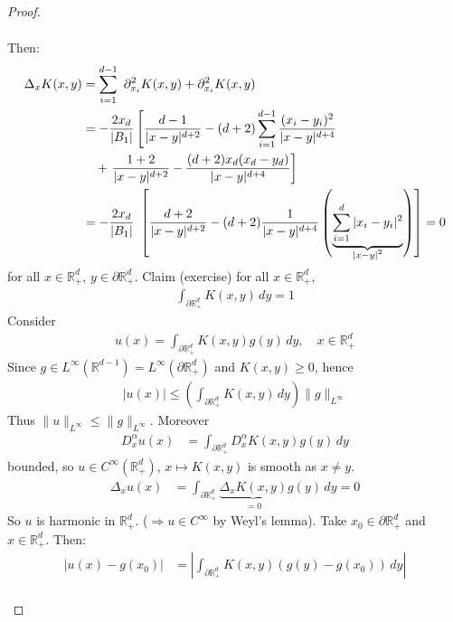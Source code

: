 \documentclass{report}
\theoremstyle{tommy}
\begin{document}
\begin{proof}
\begin{itemize}
\begin{align*}
      \end{align*}
      Then: \begin{align*}
        \Delta_x K(x,y) 
        &= \sum_{i=1}^{d-1} \partial_{x_i}^2 K(x,y) + \partial_{x_i}^2 K(x,y) \\
        &= - \frac{2 x_d}{|B_1|} \left[\frac{d-1}{|x-y|^{d+2}} - (d+2) \sum_{i=1}^{d-1} \frac{(x_i - y_i)^2}{|x-y|^{d+4}} \right. \\
        &\quad + \left. \frac{1+2}{|x-y|^{d+2}} - \frac{(d+2)x_d(x_d-y_d)}{|x-y|^{d+4}}\right] \\
        &= - \frac{2 x_d}{|B_1|} \left[\frac{d+2}{|x-y|^{d+2}} - (d+2) \frac{1}{|x-y|^{d+4}} \left(\underbrace{\sum_{i=1}^d |x_i - y_i|^2}_{\smash{|x-y|^2}}\right)\right] = 0
      \end{align*}
      for all \(x \in \mathbb{R}_+^d\), \(y \in \partial \mathbb{R}_+^d\).
      Claim (exercise) for all \(x \in \mathbb{R}_+^d\), 
      \begin{align*}
        \int_{\partial \mathbb{R}_+^d} K(x,y) \, dy = 1 
      \end{align*}
      Consider 
      \begin{align*}
        u(x) = \int_{\partial \mathbb{R}_+^d} K(x,y) g(y) \, dy, \quad x \in \mathbb{R}_+^d
      \end{align*}
      Since \(g \in L^\infty(\mathbb{R}^{d-1}) = L^\infty(\partial \mathbb{R}_+^d)\) and \(K(x,y) \ge 0\), hence 
      \begin{align*}
        |u(x)| \le \left(\int_{\partial \mathbb{R}_+^d} K(x,y) \, dy\right) \|g\|_{L^\infty}
      \end{align*}
      Thus \(\|u\|_{L^\infty} \le \|g\|_{L^\infty}\). Moreover 
      \begin{align*}
        D_x^\alpha u(x) &= \int_{\partial \mathbb{R}_+^d} D_x^\alpha K(x,y) g(y) \, dy
      \end{align*}
      bounded, so \(u \in C^\infty(\mathbb{R}_+^d)\), \(x \mapsto K(x,y)\) is smooth as \(x \ne y\).
      \begin{align*}
        \Delta_x u(x) &= \int_{\partial \mathbb{R}_+^d} \underbrace{\Delta_x K(x,y)}_{= 0} g(y) \, dy = 0
      \end{align*}
      So \(u\) is harmonic in \(\mathbb{R}^d_+\). (\(\Rightarrow u \in C^\infty\) by Weyl's lemma). Take \(x_0 \in \partial \mathbb{R}_+^d\) and \(x \in \mathbb{R}_+^d\). Then:
      \begin{align*}
        |u(x)-g(x_0)| 
        &= \left| \int_{\partial \mathbb{R}_+^d} K(x,y)(g(y) - g(x_0)) \, dy \right| \\

\end{align*}
\end{itemize}
\end{proof}
\end{document}
